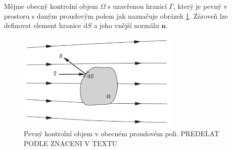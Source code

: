 Mějme obecný kontrolní objem $\Omega$ s uzavřenou hranicí $\Gamma$, který je pevný v prostoru s daným proudovým polem jak naznačuje obrázek \ref{fig:kontrolni-objem}. Zároveň lze definovat element hranice $\mathrm{d}S$ a jeho vnější normálu $\mathbf{n}$.
\begin{figure}[h]
\includegraphics[width=0.7\textwidth]{img/kontrolni_objem.png}
\caption{Pevný kontrolní objem v obecném proudovém poli. \cite{blazek2015computational} PREDELAT PODLE ZNACENI V TEXTU}
\label{fig:kontrolni-objem}
\end{figure}


